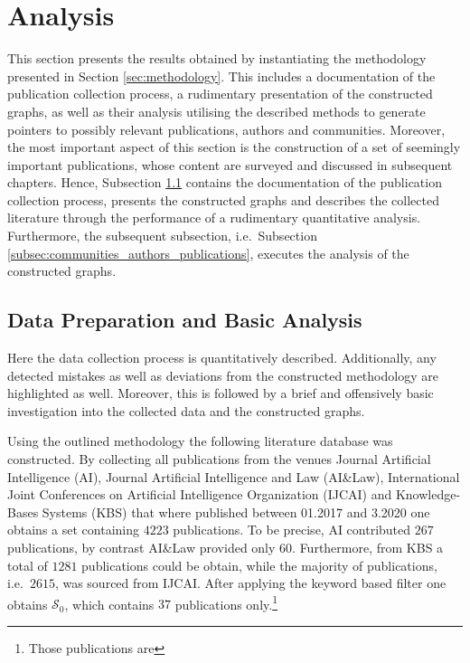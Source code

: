 \documentclass[11pt,a4paper]{book}
\theoremstyle{definition}
\theoremstyle{definition}
\theoremstyle{definition}
\theoremstyle{remark}
\newcommand{\xsetz}{\mathcal{S}_{\mathit{0}}}
\begin{document}
\section{Analysis}
\label{sec:results}
This section presents the results obtained by instantiating the methodology presented in Section \ref{sec:methodology}. This includes a documentation of the publication collection process, a rudimentary presentation of the constructed graphs, as well as their analysis utilising the described methods to generate pointers to possibly relevant publications, authors and communities. Moreover, the most important aspect of this section is the construction of a set of seemingly important publications, whose content are surveyed and discussed in subsequent chapters.
Hence, Subsection \ref{subsec:basic_data_analysis} contains the documentation of the publication collection process, presents the constructed graphs and describes the collected literature through the performance of a rudimentary quantitative analysis. 
Furthermore, the subsequent subsection, i.e.\ Subsection \ref{subsec:communities_authors_publications}, executes the analysis of the constructed graphs.


\subsection{Data Preparation and Basic Analysis}
\label{subsec:basic_data_analysis}
Here the data collection process is quantitatively described. Additionally, any detected mistakes as well as deviations from the constructed methodology are highlighted as well.    
Moreover, this is followed by a brief and offensively basic investigation into the collected data and the constructed graphs.



Using the outlined methodology the following literature database was constructed. 
By collecting all publications from the venues
Journal Artificial Intelligence (AI), Journal Artificial Intelligence and Law (AI\&Law), International Joint Conferences on Artificial Intelligence Organization (IJCAI) and Knowledge-Bases Systems (KBS) that where published between 01.2017 and 3.2020 one obtains a set containing $4223$ publications. To be precise, AI contributed $267$ publications, by contrast  AI\&Law provided only $60$. Furthermore, from KBS a total of $1281$ publications could be obtain, while the majority of publications, i.e.\ $2615$, was sourced from IJCAI.
After applying the keyword based filter one obtains $\xsetz$, which contains $37$ publications only.\footnote{Those publications are\parencite{van2019separators,verheij2017proof,chen2019judicial,neil2019modelling,li2019context,lu2018mining,zhang2018collective,
constantinou2017towards,liang2017evaluation,zhang2017characterizing,mu2018measuring,kronegger2019backdoors,hyttinen2017core,
zhang2017transfer,zhang2017causal,liu2017cause,summerville2017charda,zhang2016causal,albrecht2016exploiting,chai2018language,
bochman2018actual,ibeling2018conditional,laurent2018counterfactual,chikahara2018causal,zhang2017achieving,backstrom2018novel,
jaber2018graphical,sridhar2018scalable,wenjuan2018mixed,xu2019achieving,zhang2019asp,Cai2019CausalDW,Sridhar2019EstimatingCE,
xie2019boosting,hassanzadeh2019answering,shankar2019three,Liepina2019ArguingAC}}
\end{document}
